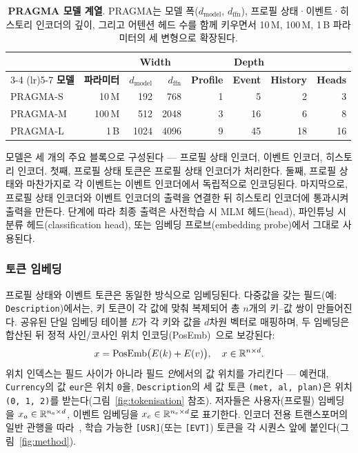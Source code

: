 \begin{table}[t]
    \centering
    \begin{tabular}{lr rr rrr r}
        & & \multicolumn{2}{c}{\textbf{Width}} & \multicolumn{3}{c}{\textbf{Depth}} & \\
        \cmidrule(lr){3-4} \cmidrule(lr){5-7}
        \textbf{모델} & \textbf{파라미터} & \textbf{$d_{\mathrm{model}}$} & \textbf{$d_{\mathrm{ffn}}$} & \textbf{Profile} & \textbf{Event} & \textbf{History} & \textbf{Heads} \\
        \midrule
        PRAGMA-S &  10\,M & 192  & 768  & 1 & 5  & 2  & 3  \\
        PRAGMA-M & 100\,M & 512  & 2048 & 3 & 16 & 6  & 8  \\
        PRAGMA-L &   1\,B & 1024 & 4096 & 9 & 45 & 18 & 16 \\
    \end{tabular}
    \caption{
        \textbf{PRAGMA 모델 계열}.
        PRAGMA는 모델 폭($d_{\mathrm{model}}$, $d_{\mathrm{ffn}}$), 프로필 상태·이벤트·히스토리 인코더의 깊이, 그리고 어텐션 헤드 수를 함께 키우면서 10\,M, 100\,M, 1\,B 파라미터의 세 변형으로 확장된다.
    }
    \label{tab:model_family}
\end{table}

모델은 세 개의 주요 블록으로 구성된다 — 프로필 상태 인코더, 이벤트 인코더, 히스토리 인코더.
첫째, 프로필 상태 토큰은 프로필 상태 인코더가 처리한다.
둘째, 프로필 상태와 마찬가지로 각 이벤트는 이벤트 인코더에서 독립적으로 인코딩된다.
마지막으로, 프로필 상태 인코더와 이벤트 인코더의 출력을 연결한 뒤 히스토리 인코더에 통과시켜 출력을 만든다.
단계에 따라 최종 출력은 사전학습 시 MLM 헤드(head), 파인튜닝 시 분류 헤드(classification head), 또는 임베딩 프로브(embedding probe)에서 그대로 사용된다.

\subsubsection{토큰 임베딩}
\label{sec:token_embedding}
프로필 상태와 이벤트 토큰은 동일한 방식으로 임베딩된다.
다중값을 갖는 필드(예: \texttt{Description})에서는, 키 토큰이 각 값에 맞춰 복제되어 총 $n$개의 키--값 쌍이 만들어진다.
공유된 단일 임베딩 테이블 $E$가 각 키와 값을 $d$차원 벡터로 매핑하며, 두 임베딩은 합산된 뒤 정적 사인/코사인 위치 인코딩(PosEmb)~\citep{vaswani2017attention}으로 보강된다:
\begin{align}
    x = \text{PosEmb}\big(E(k) + E(v)\big), \quad x \in \mathbb{R}^{n \times d}.
\end{align}
위치 인덱스는 필드 사이가 아니라 필드 \emph{안}에서의 값 위치를 가리킨다 — 예컨대, \texttt{Currency}의 값 \texttt{eur}은 위치 \texttt{0}을, \texttt{Description}의 세 값 토큰 \texttt{(met,\,al,\,plan)}은 위치 \texttt{(0,\,1,\,2)}를 받는다(그림~\ref{fig:tokenisation} 참조).
저자들은 사용자(프로필) 임베딩을 $x_a \in \mathbb{R}^{n_a \times d}$, 이벤트 임베딩을 $x_e \in \mathbb{R}^{n_e \times d}$로 표기한다.
인코더 전용 트랜스포머의 일반 관행을 따라~\citep{devlin2019bert,dosovitskiy2021image}, 학습 가능한 \texttt{[USR]}(또는 \texttt{[EVT]}) 토큰을 각 시퀀스 앞에 붙인다(그림~\ref{fig:method}).


